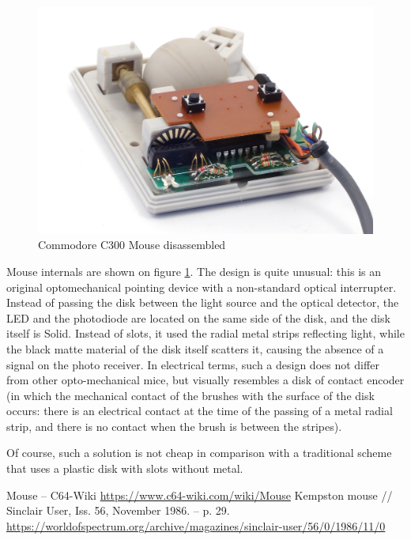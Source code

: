 \documentclass[11pt, a4paper]{article}
\begin{document}
\begin{figure}[h]
    \centering
    \includegraphics[scale=0.7]{1986_commodore_c300_mouse/cm4raz_30.jpg}
    \caption{Commodore C300 Mouse disassembled}
    \label{fig:C300Inside}
\end{figure}

Mouse internals are shown on figure \ref{fig:C300Inside}. The design is quite unusual: this is an original optomechanical pointing device with a non-standard optical interrupter. Instead of passing the disk between the light source and the optical detector, the LED and the photodiode are located on the same side of the disk, and the disk itself is Solid. Instead of slots, it used the radial metal strips reflecting light, while the black matte material of the disk itself scatters it, causing the absence of a signal on the photo receiver. In electrical terms, such a design does not differ from other opto-mechanical mice, but visually resembles a disk of contact encoder (in which the mechanical contact of the brushes with the surface of the disk occurs: there is an electrical contact at the time of the passing of a metal radial strip, and there is no contact when the brush is between the stripes).

Of course, such a solution is not cheap in comparison with a traditional scheme that uses a plastic disk with slots without metal.

\begin{thebibliography}{9}
 Mouse -- C64-Wiki \url{https://www.c64-wiki.com/wiki/Mouse}
 Kempston mouse // Sinclair User, Iss. 56, November 1986. -- p. 29. \url{https://worldofspectrum.org/archive/magazines/sinclair-user/56/0/1986/11/0}
\end{thebibliography}
\end{document}

